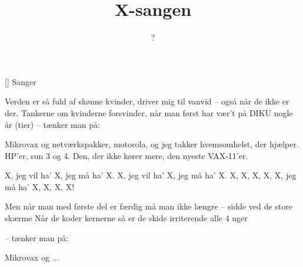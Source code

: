 \documentclass[a4paper,11pt]{article}
\title{X-sangen}
\author{?}
\begin{document}
\maketitle

\begin{roles}
[] Sanger
\end{roles}


\begin{song}
%
Verden er så fuld af skønne kvinder,
driver mig til vanvid
-- også når de ikke er der.
Tankerne om kvinderne forsvinder,
når man først har vær't på
DIKU nogle år (tier)
-- tænker man på:

Mikrovax og netværkspakker,
motorola, og jeg takker
hvemsomhelst, der hjælper.
HP'er, sun 3 og 4.
Den, der ikke kører mere,
den nyeste VAX-11'er.

X, jeg vil ha' X, jeg må ha' X.
X, jeg vil ha' X, jeg må ha' X.
X, X, X, X, X,
jeg må ha' X, X, X, X!

Men når man med første del er færdig
må man ikke længre
-- sidde ved de store skærme
Når de koder kernerne så er de
skide irriterende
alle 4 uger

-- tænker man på:

Mikrovax og ...
\end{song}
\end{document}
